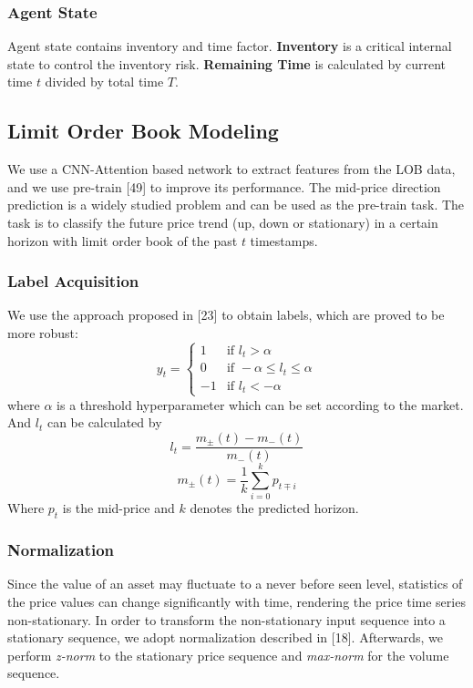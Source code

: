 \documentclass[conference]{IEEEtran}
\begin{document}
\subsubsection{Agent State}
Agent state contains inventory and time factor. \textbf{Inventory} is a critical internal state to control the inventory risk. \textbf{Remaining Time} is calculated by current time $t$ divided by total time $T$.

\subsection{Limit Order Book Modeling}
We use a CNN-Attention based network to extract features from the LOB data, and we use pre-train [49] to improve its performance. The mid-price direction prediction is a widely studied problem and can be used as the pre-train task. The task is to classify the future price trend (up, down or stationary) in a certain horizon with limit order book of the past $t$ timestamps.

\subsubsection{Label Acquisition}
We use the approach proposed in [23] to obtain labels, which are proved to be more robust:
\begin{equation}
y_t = 
\begin{cases} 
1 & \text{if } l_t > \alpha \\
0 & \text{if } -\alpha \le l_t \le \alpha \\
-1 & \text{if } l_t < -\alpha 
\end{cases} \tag{5}
\end{equation}
where $\alpha$ is a threshold hyperparameter which can be set according to the market. And $l_t$ can be calculated by
\begin{equation}
l_t = \frac{m_{\pm}(t) - m_{-}(t)}{m_{-}(t)} \tag{6}
\end{equation}
\begin{equation}
m_{\pm}(t) = \frac{1}{k} \sum_{i=0}^k p_{t \mp i} \tag{7}
\end{equation}
Where $p_t$ is the mid-price and $k$ denotes the predicted horizon.

\subsubsection{Normalization}
Since the value of an asset may fluctuate to a never before seen level, statistics of the price values can change significantly with time, rendering the price time series non-stationary. In order to transform the non-stationary input sequence into a stationary sequence, we adopt normalization described in [18]. Afterwards, we perform \textit{z-norm} to the stationary price sequence and \textit{max-norm} for the volume sequence.
\end{document}
